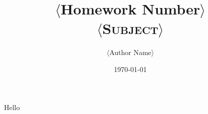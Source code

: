 \documentclass{article}
\title{\Huge{$\langle$Homework Number$\rangle$}
	\\
	\Large\scshape{$\langle$Subject$\rangle$}}
\author{$\langle$Author Name$\rangle$}
\date{\today}
\begin{document}
\maketitle
	
Hello
\end{document}
